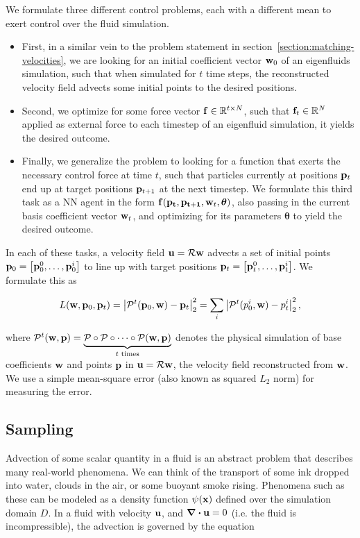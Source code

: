 We formulate three different control problems, each with a different mean to
exert control over the fluid simulation.
\begin{itemize}
  \item First, in a similar vein to the problem statement in
    section~\ref{section:matching-velocities}, we are looking for an initial
    coefficient vector $\vb{w}_0$ of an eigenfluids simulation, such that when
    simulated for $t$ time steps, the reconstructed velocity field advects some
    initial points to the desired positions.
  \item Second, we optimize for some force vector $\vb{f}\in \mathbb{R}^{t\times
    N}$, such that $\vb{f}_t \in \mathbb{R}^N$ applied as external force to each
    timestep of an eigenfluid simulation, it yields the desired outcome.
  \item Finally, we generalize the problem to looking for a function that exerts
    the necessary control force at time $t$, such that particles currently at
    positions $\vb{p}_t$ end up at target positions $\vb{p}_{t+1}$ at the
    next timestep. We formulate this third task as a \acf{NN} agent in the
    form $\vb{f}(\vb{p_t}, \vb{p_{t+1}}, \vb{w}_{t}, \boldsymbol\theta)$, also
    passing in the current basis coefficient vector $\vb{w}_t$, and optimizing
    for its parameters $\boldsymbol\theta$ to yield the desired outcome.
\end{itemize}

In each of these tasks, a velocity field $\vb{u} = \mathcal{R}\vb{w}$ advects
a set of initial points $\vb{p}_0 = \left[\vb{p}_0^0,\dots, \vb{p}_0^i\right]$
to line up with target positions $\vb{p}_t = \left[\vb{p}_t^0, \dots,
\vb{p}_t^i\right]$.  We formulate this as 

\begin{equation}
  L(\vb{w}, \vb{p}_0, \vb{p}_t)
  = \left| \mathcal{P}^{t}(\vb{p}_0, \vb{w}) - \vb{p}_t\right|_2^2 
  = \sum_{i}\left|\mathcal{P}^{t}(p_0^i, \vb{w}) - p_t^i\right|_2^2, 
\end{equation}

where $\mathcal{P}^t(\vb{w}, \vb{p}) = \underbrace{\mathcal{P} \circ
\mathcal{P}\circ \dots \circ \mathcal{P}(\vb{w}, \vb{p})}_{t \text{ times}}$
denotes the physical simulation of base coefficients $\vb{w}$ and points
$\vb{p}$ in $\vb{u} = \mathcal{R}\vb{w}$, the velocity field reconstructed from
$\vb{w}$.  We use a simple mean-square error (also known as squared $L_2$ norm)
for measuring the error.

\subsection{Sampling}\label{section:sampling}
Advection of some scalar quantity in a fluid is an abstract problem that
describes many real-world phenomena. We can think of the transport of some ink
dropped into water, clouds in the air, or some buoyant smoke rising. Phenomena
such as these can be modeled as a density function $\psi(\vb{x})$ defined over
the simulation domain $D$. In a fluid with velocity $\vb{u}$, and $\div{\vb{u}}
= 0$ (i.e. the fluid is incompressible), the advection is governed by the
equation

